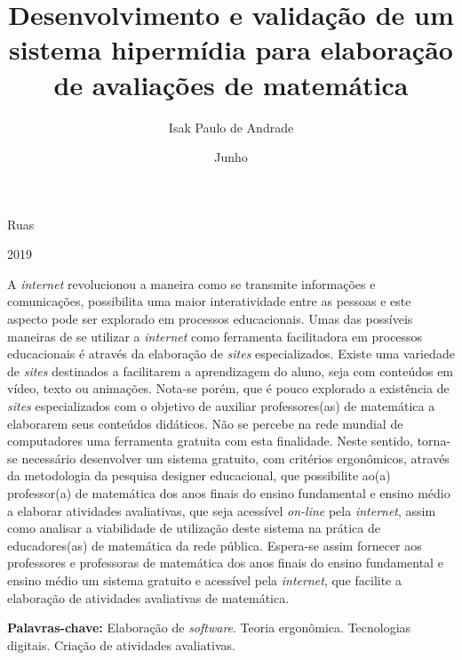 \documentclass{IFNMG}
\begin{document}
%
\author{Isak Paulo de Andrade}{Ruas}
\title{Desenvolvimento e validação de um sistema hipermídia para elaboração de avaliações de matemática}{} %
\date{Junho}{2019}

%
\maketitle			%


\begin{Resumo}
A \textit{internet} revolucionou a maneira como se transmite informações e comunicações, possibilita uma maior interatividade entre as pessoas e este aspecto pode ser explorado em processos educacionais. Umas das possíveis maneiras de se utilizar a \textit{internet} como ferramenta facilitadora em processos educacionais é através da elaboração de \textit{sites} especializados. Existe uma variedade de \textit{sites} destinados a facilitarem a aprendizagem do aluno, seja com conteúdos em vídeo, texto ou animações. Nota-se porém, que é pouco explorado a existência de \textit{sites} especializados com o objetivo de auxiliar  professores(as) de matemática a elaborarem seus conteúdos didáticos. Não se percebe na rede mundial de computadores uma ferramenta gratuita com esta finalidade. Neste sentido, torna-se necessário desenvolver um sistema gratuito, com critérios ergonômicos, através da metodologia da pesquisa designer educacional, que possibilite ao(a) professor(a) de matemática dos anos finais do ensino fundamental e ensino médio a elaborar atividades avaliativas, que seja acessível \textit{on-line} pela \textit{internet}, assim como analisar a viabilidade de utilização deste sistema na prática de educadores(as) de matemática da rede pública. Espera-se assim fornecer aos professores e professoras de matemática dos anos finais do ensino fundamental e ensino médio um sistema gratuito e acessível pela \textit{internet}, que facilite a elaboração de atividades avaliativas de matemática.
	
\textbf{Palavras-chave: }{ Elaboração de \textit{software}. Teoria ergonômica. Tecnologias digitais. Criação de atividades avaliativas.}
\end{Resumo}
\end{document}
